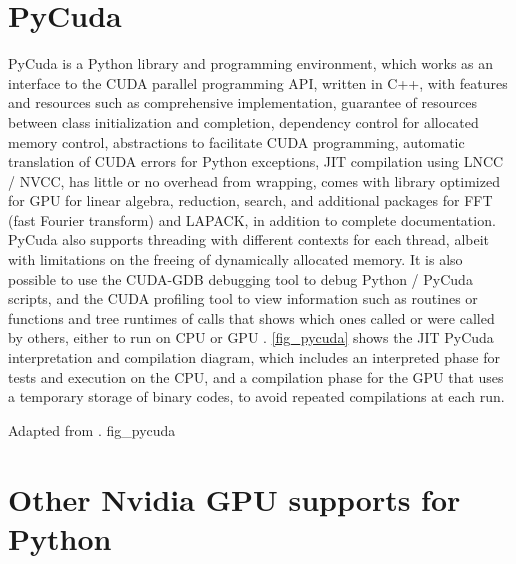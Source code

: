 \section{PyCuda}
\label{sec_apprpycu}

PyCuda is a Python library and programming environment, which works as an interface to the CUDA parallel programming API, written in C++, with features and resources such as comprehensive implementation, guarantee of resources between class initialization and completion, dependency control for allocated memory control, abstractions to facilitate CUDA programming, automatic translation of CUDA errors for Python exceptions, JIT compilation using LNCC / NVCC, has little or no overhead from wrapping, comes with library optimized for GPU for linear algebra, reduction, search, and additional packages for FFT (fast Fourier transform) and LAPACK, in addition to complete documentation. PyCuda also supports threading with different contexts for each thread, albeit with limitations on the freeing of dynamically allocated memory. It is also possible to use the CUDA-GDB debugging tool to debug Python / PyCuda scripts, and the CUDA profiling tool to view information such as routines or functions and tree runtimes of calls that shows which ones called or were called by others, either to run on CPU or GPU \cite{Klockner2012}. \autoref {fig_pycuda} shows the JIT PyCuda interpretation and compilation diagram, which includes an interpreted phase for tests and execution on the CPU, and a compilation phase for the GPU that uses a temporary storage of binary codes, to avoid repeated compilations at each run.

 {Adapted from .} {fig_pycuda}




\section{Other Nvidia GPU supports for Python}

